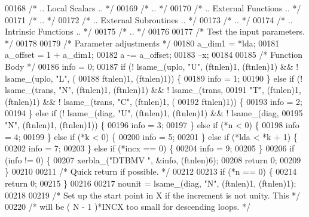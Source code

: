 \begin{DoxyCode}
00168 \textcolor{comment}{/*     .. Local Scalars .. */}
00169 \textcolor{comment}{/*     .. */}
00170 \textcolor{comment}{/*     .. External Functions .. */}
00171 \textcolor{comment}{/*     .. */}
00172 \textcolor{comment}{/*     .. External Subroutines .. */}
00173 \textcolor{comment}{/*     .. */}
00174 \textcolor{comment}{/*     .. Intrinsic Functions .. */}
00175 \textcolor{comment}{/*     .. */}
00176 
00177 \textcolor{comment}{/*     Test the input parameters. */}
00178 
00179     \textcolor{comment}{/* Parameter adjustments */}
00180     a\_dim1 = *lda;
00181     a\_offset = 1 + a\_dim1;
00182     a -= a\_offset;
00183     --x;
00184 
00185     \textcolor{comment}{/* Function Body */}
00186     info = 0;
00187     \textcolor{keywordflow}{if} (! lsame\_(uplo, \textcolor{stringliteral}{"U"}, (ftnlen)1, (ftnlen)1) && ! lsame\_(uplo, \textcolor{stringliteral}{"L"}, (
00188         ftnlen)1, (ftnlen)1)) \{
00189     info = 1;
00190     \} \textcolor{keywordflow}{else} \textcolor{keywordflow}{if} (! lsame\_(trans, \textcolor{stringliteral}{"N"}, (ftnlen)1, (ftnlen)1) && ! lsame\_(trans, 
00191         \textcolor{stringliteral}{"T"}, (ftnlen)1, (ftnlen)1) && ! lsame\_(trans, \textcolor{stringliteral}{"C"}, (ftnlen)1, (
00192         ftnlen)1)) \{
00193     info = 2;
00194     \} \textcolor{keywordflow}{else} \textcolor{keywordflow}{if} (! lsame\_(diag, \textcolor{stringliteral}{"U"}, (ftnlen)1, (ftnlen)1) && ! lsame\_(diag, 
00195         \textcolor{stringliteral}{"N"}, (ftnlen)1, (ftnlen)1)) \{
00196     info = 3;
00197     \} \textcolor{keywordflow}{else} \textcolor{keywordflow}{if} (*n < 0) \{
00198     info = 4;
00199     \} \textcolor{keywordflow}{else} \textcolor{keywordflow}{if} (*k < 0) \{
00200     info = 5;
00201     \} \textcolor{keywordflow}{else} \textcolor{keywordflow}{if} (*lda < *k + 1) \{
00202     info = 7;
00203     \} \textcolor{keywordflow}{else} \textcolor{keywordflow}{if} (*incx == 0) \{
00204     info = 9;
00205     \}
00206     \textcolor{keywordflow}{if} (info != 0) \{
00207     xerbla\_(\textcolor{stringliteral}{"DTBMV "}, &info, (ftnlen)6);
00208     \textcolor{keywordflow}{return} 0;
00209     \}
00210 
00211 \textcolor{comment}{/*     Quick return if possible. */}
00212 
00213     \textcolor{keywordflow}{if} (*n == 0) \{
00214     \textcolor{keywordflow}{return} 0;
00215     \}
00216 
00217     nounit = lsame\_(diag, \textcolor{stringliteral}{"N"}, (ftnlen)1, (ftnlen)1);
00218 
00219 \textcolor{comment}{/*     Set up the start point in X if the increment is not unity. This */}
00220 \textcolor{comment}{/*     will be  ( N - 1 )*INCX   too small for descending loops. */}

\end{DoxyCode}
